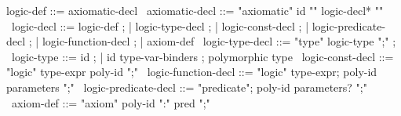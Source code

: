 \begin{syntax}
  logic-def ::= axiomatic-decl
  \
  axiomatic-decl ::= "axiomatic" id "{" logic-decl* "}"
  \
  logic-decl ::= logic-def ;
  | logic-type-decl ;
  | logic-const-decl ;
  | logic-predicate-decl ;
  | logic-function-decl ;
  | axiom-def 
  \
  logic-type-decl ::= "type" logic-type ";" ;
  \
  logic-type ::= id ;
  | id type-var-binders ; polymorphic type
  \
  logic-const-decl ::=  "logic" type-expr poly-id ";"
  \
  logic-function-decl ::=
  "logic" type-expr;
  poly-id parameters ";"
  \
  logic-predicate-decl ::=
  "predicate";
  poly-id parameters? ";"
  \
  axiom-def ::= "axiom" poly-id ":" pred ";" 
\end{syntax}
